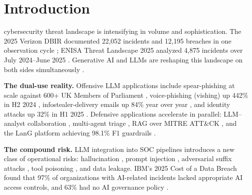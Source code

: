 \documentclass[journal]{IEEEtran}
\begin{document}
\section{Introduction}
\label{sec:intro}

 cybersecurity threat landscape is intensifying in volume and sophistication.
The 2025 Verizon DBIR documented 22{,}052 incidents and 12{,}195 breaches in one observation
cycle \cite{dbir2025}; ENISA Threat Landscape 2025 analyzed 4{,}875 incidents over July
2024--June 2025 \cite{enisa2025}. Generative AI and LLMs are reshaping this landscape on both
sides simultaneously \cite{llmsurvey2024,contextualizedai2024,redblue2025}.

\textbf{The dual-use reality.}
Offensive LLM applications include spear-phishing at scale against 600+ UK Members of Parliament
\cite{hazell2023spear}, voice-phishing (vishing) up 442\% in H2 2024 \cite{crowdstrike2025},
infostealer-delivery emails up 84\% year over year \cite{xforce2025}, and identity attacks up
32\% in H1 2025 \cite{mddr2025}. Defensive applications accelerate in parallel: LLM--analyst
collaboration \cite{llmsoc2025}, multi-agent triage \cite{cortex2025}, RAG over MITRE ATT\&CK
\cite{techniquerag2025,fayyazi2024llm}, and the LanG platform achieving 98.1\% F1 guardrails
\cite{lang2026}.

\textbf{The compound risk.}
LLM integration into SOC pipelines introduces a new class of operational risks: hallucination
\cite{ji2023hallucination}, prompt injection \cite{greshake2023indirect,liu2024formalizing},
adversarial suffix attacks \cite{zou2023universal}, tool poisoning \cite{owasp2025agentic},
and data leakage. IBM's 2025 Cost of a Data Breach found that 97\% of organizations with
AI-related incidents lacked appropriate AI access controls, and 63\% had no AI governance policy
\cite{ibm2025costbreach}.
\end{document}
